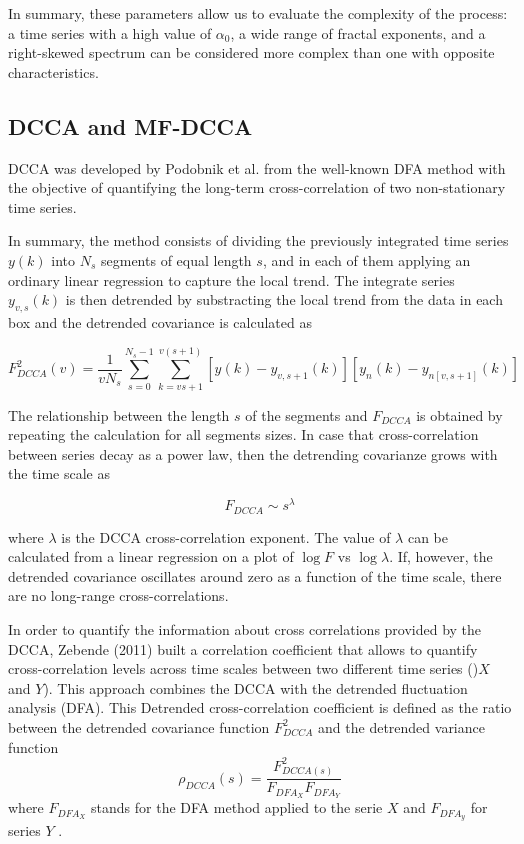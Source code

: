 \documentclass[onecolumn, preprint,aps,amsmath, amssymb, superscriptaddress]{revtex4}
\begin{document}
In summary, these parameters allow us to evaluate the complexity of the process: a time series with a high value of $\alpha_0$, a wide range of fractal exponents, and a right-skewed spectrum can be considered more complex than one with opposite characteristics.

\subsection{DCCA and MF-DCCA}

DCCA was developed by Podobnik et al. \cite{Podobnik} from the well-known DFA method \cite{Peng} with the objective of quantifying the long-term cross-correlation of two non-stationary time series. 

In summary, the method consists of dividing the previously integrated time series $y(k)$ into $N_s$ segments of equal length $s$, and in each of them applying an ordinary linear regression to capture the local trend. 
The integrate series $y_{v,s}(k)$ is then detrended by substracting the local trend from the data in each box and the detrended covariance is calculated as

\begin{equation}
F^2_{DCCA}(v) = \dfrac{1}{vN_s}\sum_{s=0}^{N_s-1}\sum_{k=vs+1}^{v(s+1)}\left[y(k)-y_{v,s+1}(k)\right] \left[y_n(k)-y_{n[v,s+1]}(k)\right]
\end{equation}

The relationship between the length $s$ of the segments and $F_{DCCA}$ is obtained by repeating the calculation for all segments sizes. In case that cross-correlation between series decay as a power law, then the detrending covarianze grows with the time scale as

\begin{equation}
F_{DCCA}\sim s^\lambda
\end{equation}

where $\lambda$ is the DCCA cross-correlation exponent. The value of $\lambda$ can be calculated from a linear regression on a plot of $\log F$ vs $\log \lambda$. If, however, the detrended covariance oscillates around zero as a function of the time scale, there are no long-range cross-correlations.

In order to quantify the information about cross correlations provided by the DCCA, Zebende (2011) built a correlation coefficient that allows to quantify cross-correlation levels across time scales between two different time series ()$X$ and $Y$). This approach combines the DCCA with the detrended fluctuation analysis (DFA). This Detrended cross-correlation coefficient is defined as the ratio between the detrended covariance function $F^2_{DCCA}$ and the detrended variance function \cite{Zebende}
\begin{equation}
    \rho_{DCCA}(s) =\dfrac{F^2_{DCCA(s)}}{F_{DFA_X}F_{DFA_Y}}
\end{equation}
where $F_{DFA_X}$ stands for the DFA method applied to the serie $X$ and $F_{DFA_y}$ for series $Y$ .
\end{document}
